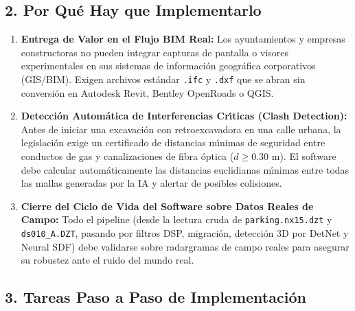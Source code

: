 \documentclass[11pt,a4paper]{article}
\begin{document}
\subsection{2. Por Qu{\'e} Hay que Implementarlo}
\begin{enumerate}
    \item \textbf{Entrega de Valor en el Flujo BIM Real:} Los ayuntamientos y empresas constructoras no pueden integrar capturas de pantalla o visores experimentales en sus sistemas de informaci{\'o}n geogr{\'a}fica corporativos (GIS/BIM). Exigen archivos est{\'a}ndar \texttt{.ifc} y \texttt{.dxf} que se abran sin conversi{\'o}n en Autodesk Revit, Bentley OpenRoads o QGIS.
    \item \textbf{Detecci{\'o}n Autom{\'a}tica de Interferencias Cr{\'\i}ticas (Clash Detection):} Antes de iniciar una excavaci{\'o}n con retroexcavadora en una calle urbana, la legislaci{\'o}n exige un certificado de distancias m{\'\i}nimas de seguridad entre conductos de gas y canalizaciones de fibra {\'o}ptica ($d \ge 0.30\text{ m}$). El software debe calcular autom{\'a}ticamente las distancias euclidianas m{\'\i}nimas entre todas las mallas generadas por la IA y alertar de posibles colisiones.
    \item \textbf{Cierre del Ciclo de Vida del Software sobre Datos Reales de Campo:} Todo el pipeline (desde la lectura cruda de \texttt{parking.nx15.dzt} y \texttt{ds010\_A.DZT}, pasando por filtros DSP, migraci{\'o}n, detecci{\'o}n 3D por DetNet y Neural SDF) debe validarse sobre radargramas de campo reales para asegurar su robustez ante el ruido del mundo real.
\end{enumerate}

\subsection{3. Tareas Paso a Paso de Implementaci{\'o}n}
\end{document}
